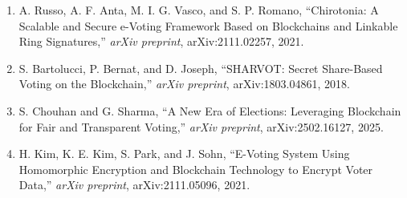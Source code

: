 \documentclass[conference]{IEEEtran}
\begin{document}
\begin{enumerate}
    \item A. Russo, A. F. Anta, M. I. G. Vasco, and S. P. Romano, ``Chirotonia: A Scalable and Secure e-Voting Framework Based on Blockchains and Linkable Ring Signatures,'' \textit{arXiv preprint}, arXiv:2111.02257, 2021.

    \item S. Bartolucci, P. Bernat, and D. Joseph, ``SHARVOT: Secret Share-Based Voting on the Blockchain,'' \textit{arXiv preprint}, arXiv:1803.04861, 2018.

    \item S. Chouhan and G. Sharma, ``A New Era of Elections: Leveraging Blockchain for Fair and Transparent Voting,'' \textit{arXiv preprint}, arXiv:2502.16127, 2025.

    \item H. Kim, K. E. Kim, S. Park, and J. Sohn, ``E-Voting System Using Homomorphic Encryption and Blockchain Technology to Encrypt Voter Data,'' \textit{arXiv preprint}, arXiv:2111.05096, 2021.
\end{enumerate}

 
\end{document}
